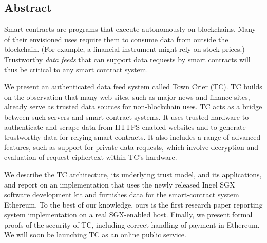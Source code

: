 \subsection*{Abstract}
Smart contracts are programs that execute autonomously on blockchains. Many of their envisioned uses require them to consume data from outside the blockchain. (For example, a financial instrument might rely on stock prices.) Trustworthy {\em data feeds} that can support data requests by smart contracts will thus be critical to any smart contract system. 

	We present an authenticated data feed system called Town Crier (TC). TC builds on the observation that many web sites, such as major news and finance sites, already serve as trusted data sources for non-blockchain uses. TC acts as a bridge between such servers and smart contract systems. It uses trusted hardware to authenticate and scrape data from HTTPS-enabled websites and to generate trustworthy data for relying smart contracts. It also includes a range of advanced features, such as support for private data requests, which involve decryption and evaluation of request ciphertext  within TC's hardware.
	
	We describe the TC architecture, its underlying trust model, and its applications, and report on an implementation that uses the newly released Ingel SGX software development kit and furnishes data for the smart-contract system Ethereum.  To the best of our knowledge, ours is the first research paper reporting system implementation on a real SGX-enabled host. Finally, we present formal proofs of the security of TC, including correct handling of payment in Ethereum. We will soon be launching TC as an online public service.
